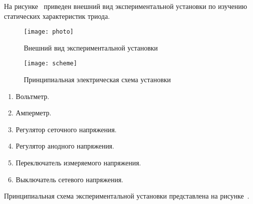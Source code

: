 На рисунке~ приведен внешний вид экспериментальной установки по
изучению статических характеристик триода.

\begin{figure}[ht]
  \center
  \texttt{[image: photo]}
    \caption{Внешний вид экспериментальной установки} \label{picLook}
  \texttt{[image: scheme]}
    \caption{Принципиальная электрическая схема установки} \label{picScheme}
\end{figure}

\begin{enumerate}
  \item Вольтметр.
  \item Амперметр.
  \item Регулятор сеточного напряжения.
  \item Регулятор анодного напряжения.
  \item Переключатель измеряемого напряжения.
  \item Выключатель сетевого напряжения.
\end{enumerate}

Принципиальная схема экспериментальной установки представлена на
рисунке~.


